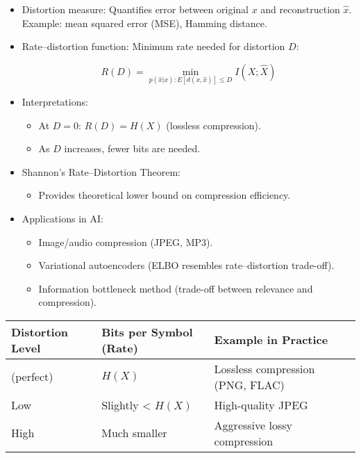 \documentclass[
  letterpaper,
  DIV=11,
  numbers=noendperiod]{scrreprt}
\providecommand{\tightlist}{%
  \setlength{\itemsep}{0pt}\setlength{\parskip}{0pt}}
\begin{document}
\begin{itemize}
\item
  Distortion measure: Quantifies error between original \(x\) and
  reconstruction \(\hat{x}\). Example: mean squared error (MSE), Hamming
  distance.
\item
  Rate--distortion function: Minimum rate needed for distortion \(D\):

  \[
  R(D) = \min_{p(\hat{x}|x): E[d(x,\hat{x})] \leq D} I(X;\hat{X})
  \]
\item
  Interpretations:

  \begin{itemize}
  \tightlist
  \item
    At \(D=0\): \(R(D)=H(X)\) (lossless compression).
  \item
    As \(D\) increases, fewer bits are needed.
  \end{itemize}
\item
  Shannon's Rate--Distortion Theorem:

  \begin{itemize}
  \tightlist
  \item
    Provides theoretical lower bound on compression efficiency.
  \end{itemize}
\item
  Applications in AI:

  \begin{itemize}
  \tightlist
  \item
    Image/audio compression (JPEG, MP3).
  \item
    Variational autoencoders (ELBO resembles rate--distortion
    trade-off).
  \item
    Information bottleneck method (trade-off between relevance and
    compression).
  \end{itemize}
\end{itemize}

\begin{longtable}[]{@{}
  >{\raggedright\arraybackslash}p{}
  >{\raggedright\arraybackslash}p{}
  >{\raggedright\arraybackslash}p{}@{}}
\toprule\noalign{}
\begin{minipage}[b]{\linewidth}\raggedright
Distortion Level
\end{minipage} & \begin{minipage}[b]{\linewidth}\raggedright
Bits per Symbol (Rate)
\end{minipage} & \begin{minipage}[b]{\linewidth}\raggedright
Example in Practice
\end{minipage} \\
\midrule\noalign{}
\endhead
\bottomrule\noalign{}
\endlastfoot
0 (perfect) & \(H(X)\) & Lossless compression (PNG, FLAC) \\
Low & Slightly \textless{} \(H(X)\) & High-quality JPEG \\
High & Much smaller & Aggressive lossy compression \\
\end{longtable}
\end{document}

